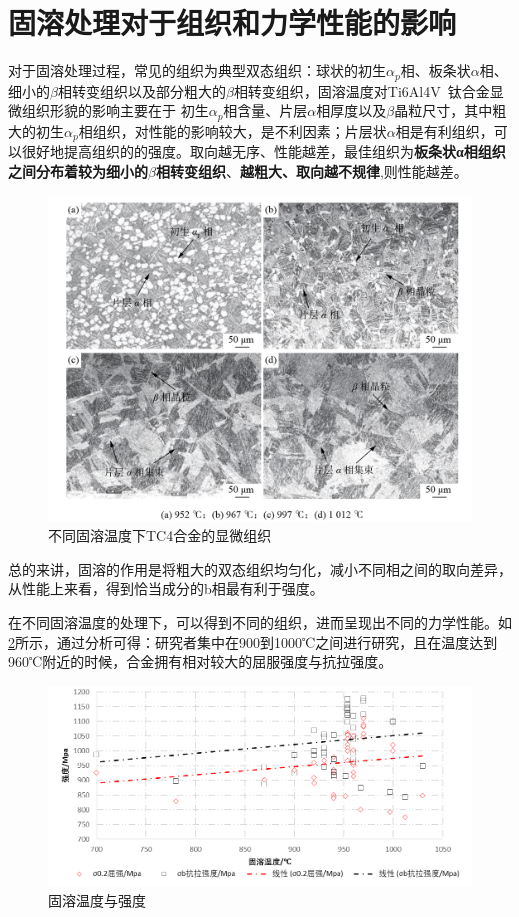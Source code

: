 \documentclass[
class = book,
zihao = -4,
font = noto,
paper = a4paper,
openany
]{easybook}
\begin{document}
\section{固溶处理对于组织和力学性能的影响}

对于固溶处理过程，常见的组织为典型双态组织：球状的初生$ \alpha_p $相、板条状$ \alpha $相、细小的$ \beta $相转变组织以及部分粗大的$ \beta $相转变组织\cite{zhanghaoyinGurongShixiaoduiTC4taihejinzuzhihelixuexingnengdeyingxiang2014}，固溶温度对Ti6Al4V 钛合金显微组织形貌的影响主要在于 初生$ \alpha_p $相含量、片层$ \alpha $相厚度以及$\beta$晶粒尺寸，其中粗大的初生$ \alpha_p $相组织，对性能的影响较大，是不利因素；片层状$ \alpha $相是有利组织，可以很好地提高组织的的强度\cite{ranxingGurongwenduduiTi6Al4VELItaihejinxianweizuzhijixingnengdeyingxiang2021}。取向越无序、性能越差，最佳组织为\textbf{板条状α相组织之间分布着较为细小的$\beta$相转变组织}、\textbf{越粗大、取向越不规律},则性能越差。
\begin{figure}[h!]
	\centering
	\includegraphics[width=0.7\linewidth]{金相_丙}
	\caption{不同固溶温度下TC4合金的显微组织}
	\label{fig:}
\end{figure}


总的来讲，固溶的作用是将粗大的双态组织均匀化，减小不同相之间的取向差异，从性能上来看，得到恰当成分的b相最有利于强度。



在不同固溶温度的处理下，可以得到不同的组织，进而呈现出不同的力学性能。如\ref{fig:固溶温度与强度}所示，通过分析可得：研究者集中在900到1000℃之间进行研究，且在温度达到960℃附近的时候，合金拥有相对较大的屈服强度与抗拉强度。

\begin{figure}[h!]
	\centering
	\includegraphics[width=0.7\linewidth]{固溶温度与强度}
	\caption{固溶温度与强度}
	\label{fig:固溶温度与强度}
\end{figure}
\end{document}
